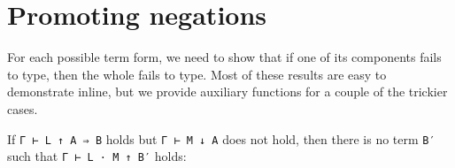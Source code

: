\hypertarget{promoting-negations}{%
\section{Promoting negations}\label{promoting-negations}}

For each possible term form, we need to show that if one of its
components fails to type, then the whole fails to type. Most of these
results are easy to demonstrate inline, but we provide auxiliary
functions for a couple of the trickier cases.

If \texttt{Γ\ ⊢\ L\ ↑\ A\ ⇒\ B} holds but \texttt{Γ\ ⊢\ M\ ↓\ A} does
not hold, then there is no term \texttt{B′} such that
\texttt{Γ\ ⊢\ L\ ·\ M\ ↑\ B′} holds:

\begin{fence}
\begin{code}%
\>[0]\AgdaSpace{}%
\AgdaSymbol{:}\AgdaSpace{}%
\AgdaSpace{}%
\AgdaSymbol{\{}\AgdaSpace{}%
\AgdaSpace{}%
\AgdaSpace{}%
\AgdaSpace{}%
\AgdaSymbol{\}}\<%
\\
\>[0][@{}l@{\AgdaIndent{0}}]%
\>[2]\AgdaSpace{}%
\AgdaSpace{}%
\AgdaSpace{}%
\AgdaSpace{}%
\AgdaSpace{}%
\AgdaSpace{}%
\AgdaSpace{}%
\<%
\\
%
\>[2]%
\>[853I]\AgdaSpace{}%
\AgdaSpace{}%
\AgdaSpace{}%
\AgdaSpace{}%
\AgdaSpace{}%
\<%
\\
\>[.][@{}l@{}]\<[853I]%
\>[4]\AgdaComment{----------------------------}\<%
\\
%
\>[2]\AgdaSpace{}%
\AgdaSpace{}%
\AgdaSymbol{(}\AgdaSpace{}%
\AgdaFunction{∃[}\AgdaSpace{}%
\AgdaSpace{}%
\AgdaFunction{]}\AgdaSpace{}%
\AgdaSpace{}%
\AgdaSpace{}%
\AgdaSpace{}%
\AgdaSpace{}%
\AgdaSpace{}%
\AgdaSpace{}%
\AgdaSpace{}%
\AgdaSymbol{)}\<%
\\
\>[0]\AgdaSpace{}%
\AgdaSpace{}%
\AgdaSpace{}%
\AgdaSpace{}%
\AgdaSpace{}%
\AgdaOperator{\AgdaInductiveConstructor{,}}\AgdaSpace{}%
\AgdaSpace{}%
\AgdaSpace{}%
\AgdaSpace{}%
\AgdaSpace{}%
\AgdaSpace{}%
\AgdaSpace{}%
\AgdaSymbol{(}\AgdaSpace{}%
\AgdaSpace{}%
\AgdaSymbol{)}\AgdaSpace{}%
\AgdaSymbol{=}\AgdaSpace{}%
\AgdaSpace{}%
\<%
\end{code}
\end{fence}

